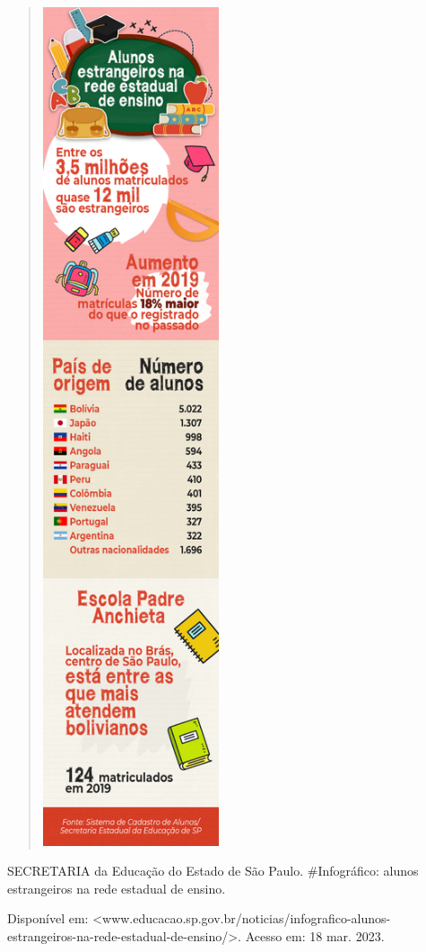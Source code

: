 \begin{escolha}
\begin{escolha}
{\begin{quote}
\includegraphics[width=2.04375in,height=9.72500in]{media/image33.png}
\end{quote}

SECRETARIA da Educação do Estado de São Paulo. \#Infográfico: alunos
estrangeiros na rede estadual de ensino.

Disponível em:
\textless{}www.educacao.sp.gov.br/noticias/infografico-alunos-estrangeiros-na-rede-estadual-de-ensino/\textgreater{}.
Acesso em: 18 mar. 2023.

}
\end{escolha}
\end{escolha}
